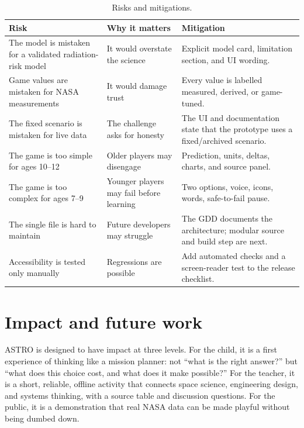 \documentclass[11pt,a4paper]{article}
\begin{document}
\begin{table}[H]
\centering
\small
\begin{tabular}{@{}p{4.0cm}p{4.2cm}p{6.2cm}@{}}
\toprule
\textbf{Risk} & \textbf{Why it matters} & \textbf{Mitigation}\\
\midrule
The model is mistaken for a validated radiation-risk model & It would overstate the science & Explicit model card, limitation section, and UI wording.\\
Game values are mistaken for NASA measurements & It would damage trust & Every value is labelled measured, derived, or game-tuned.\\
The fixed scenario is mistaken for live data & The challenge asks for honesty & The UI and documentation state that the prototype uses a fixed/archived scenario.\\
The game is too simple for ages 10--12 & Older players may disengage & Prediction, units, deltas, charts, and source panel.\\
The game is too complex for ages 7--9 & Younger players may fail before learning & Two options, voice, icons, words, safe-to-fail pause.\\
The single file is hard to maintain & Future developers may struggle & The GDD documents the architecture; modular source and build step are next.\\
Accessibility is tested only manually & Regressions are possible & Add automated checks and a screen-reader test to the release checklist.\\
\bottomrule
\end{tabular}
\caption{Risks and mitigations.}
\label{tab:risks}
\end{table}

\section{Impact and future work}

ASTRO is designed to have impact at three levels. For the child, it is a first experience of thinking like a mission planner: not ``what is the right answer?'' but ``what does this choice cost, and what does it make possible?'' For the teacher, it is a short, reliable, offline activity that connects space science, engineering design, and systems thinking, with a source table and discussion questions. For the public, it is a demonstration that real NASA data can be made playful without being dumbed down.
\end{document}
